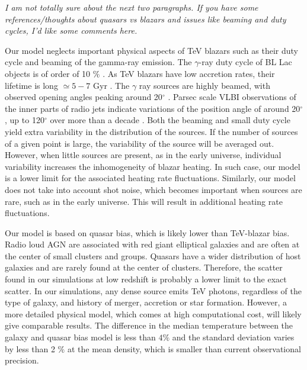 \documentclass[twocolumns]{emulateapj}
\begin{document}
{{\textit{ I am not totally sure about the next two paragraphs. If you have some references/thoughts about quasars vs blazars and issues like beaming and duty cycles, I'd like some comments here.}

Our model neglects important physical aspects of TeV blazars such as their duty cycle and  beaming of the gamma-ray emission. The  $\gamma$-ray duty cycle of BL Lac objects is of order of 10 $\%$ \citep{1996ApJ...464..600S}.  As TeV blazars have low accretion rates, their lifetime is long $\simeq 5-7$ Gyr \citep{2002ApJ...571..226C}.  The $\gamma$ ray sources are highly beamed, with observed opening angles peaking around 20$^{\circ}$ \citep{2009A&A...507L..33P}.  Parsec scale VLBI observations of the inner parts of radio jets indicate variations of the position angle of around 20$^{\circ}$, up to 120$^{\circ}$ over more than a decade \citep{2013AJ....146..120L}.   Both the beaming and small duty cycle yield extra variability in the distribution of the sources.   If the number  of sources of a given point is large, the variability of the source will be averaged out. However, when little sources are present, as in the early universe, individual variability increases the inhomogeneity of blazar heating. In such case, our model is a lower limit for the associated heating rate fluctuations. Similarly, our model does not take into account shot noise, which becomes important when sources are rare, such as in the early universe. This will result in additional heating rate fluctuations.

Our model is based on quasar bias, which is likely lower than TeV-blazar bias. Radio loud AGN are associated with red giant elliptical galaxies \citep{2007A&A...476..723H} and are often at the center of small clusters and groups. Quasars have a wider distribution of host galaxies and are rarely found at the center of clusters. Therefore, the scatter found in our simulations at low redshift is probably a lower limit to the exact scatter. In our simulations, any dense source emits TeV photons, regardless of the type of galaxy, and history of merger, accretion  or star formation.  However, a more detailed physical model, which comes at high computational cost, will likely give comparable results. The difference in the median temperature between the galaxy and quasar bias model  is less than $4\%$  and the standard deviation varies by less than 2 $\%$ at the mean density, which is smaller than current observational precision. 




}}
\end{document}
